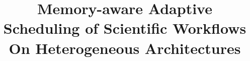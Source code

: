\documentclass[conference]{IEEEtran}
\begin{document}
    \title{Memory-aware Adaptive Scheduling of Scientific Workflows On Heterogeneous Architectures\\
    }



    \maketitle
\end{document}

